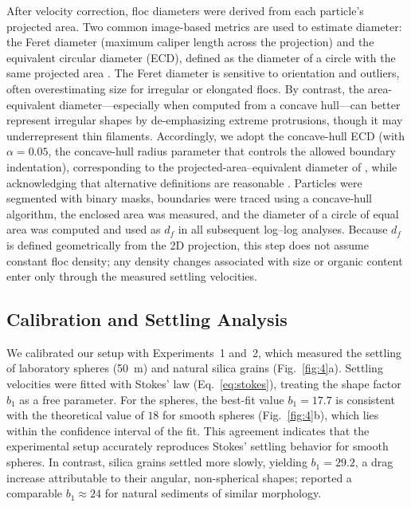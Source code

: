 \documentclass{agujournal2019}
\begin{document}
After velocity correction, floc diameters were derived from each particle's projected area. Two common image-based metrics are used to estimate diameter: the Feret diameter (maximum caliper length across the projection) and the equivalent circular diameter (ECD), defined as the diameter of a circle with the same projected area \cite{jarvis2005measuring, smith2015image}. The Feret diameter is sensitive to orientation and outliers, often overestimating size for irregular or elongated flocs. By contrast, the area-equivalent diameter---especially when computed from a concave hull---can better represent irregular shapes by de-emphasizing extreme protrusions, though it may underrepresent thin filaments. Accordingly, we adopt the concave-hull ECD (with $\alpha = 0.05$, the concave-hull radius parameter that controls the allowed boundary indentation), corresponding to the projected-area--equivalent diameter of , while acknowledging that alternative definitions are reasonable \cite{jarvis2005measuring}. Particles were segmented with binary masks, boundaries were traced using a concave-hull algorithm, the enclosed area was measured, and the diameter of a circle of equal area was computed and used as \(d_f\) in all subsequent log--log analyses. Because $d_f$ is defined geometrically from the 2D projection, this step does not assume constant floc density; any density changes associated with size or organic content enter only through the measured settling velocities.

\subsection{Calibration and Settling Analysis}

We calibrated our setup with Experiments~1 and~2, which measured the settling of laboratory spheres (50~\textmu m) and natural silica grains (Fig.~\ref{fig:4}a). Settling velocities were fitted with Stokes' law (Eq.~\eqref{eq:stokes}), treating the shape factor $b_1$ as a free parameter. For the spheres, the best-fit value $b_1 = 17.7$ is consistent with the theoretical value of $18$ for smooth spheres (Fig.~\ref{fig:4}b), which lies within the confidence interval of the fit. This agreement indicates that the experimental setup accurately reproduces Stokes' settling behavior for smooth spheres. In contrast, silica grains settled more slowly, yielding $b_1 = 29.2$, a drag increase attributable to their angular, non-spherical shapes;  reported a comparable $b_1 \approx 24$ for natural sediments of similar morphology.
\end{document}
